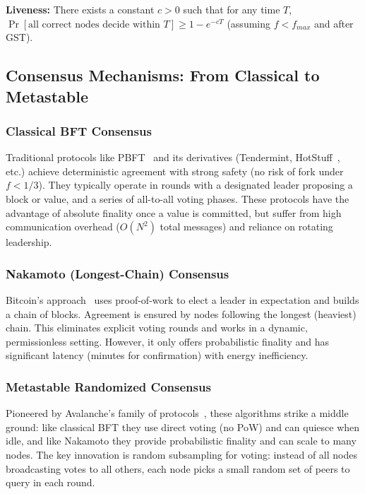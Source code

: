 \textbf{Liveness:} There exists a constant $c>0$ such that for any time $T$, $\Pr[\text{all correct nodes decide within } T] \ge 1 - e^{-c T}$ (assuming $f < f_{max}$ and after GST).

\subsection{Consensus Mechanisms: From Classical to Metastable}

\subsubsection{Classical BFT Consensus}

Traditional protocols like PBFT~\cite{pbft} and its derivatives (Tendermint, HotStuff~\cite{hotstuff}, etc.) achieve deterministic agreement with strong safety (no risk of fork under $f < 1/3$). They typically operate in rounds with a designated leader proposing a block or value, and a series of all-to-all voting phases. These protocols have the advantage of absolute finality once a value is committed, but suffer from high communication overhead ($O(N^2)$ total messages) and reliance on rotating leadership.

\subsubsection{Nakamoto (Longest-Chain) Consensus}

Bitcoin's approach~\cite{bitcoin} uses proof-of-work to elect a leader in expectation and builds a chain of blocks. Agreement is ensured by nodes following the longest (heaviest) chain. This eliminates explicit voting rounds and works in a dynamic, permissionless setting. However, it only offers probabilistic finality and has significant latency (minutes for confirmation) with energy inefficiency.

\subsubsection{Metastable Randomized Consensus}

Pioneered by Avalanche's family of protocols~\cite{avalanche}, these algorithms strike a middle ground: like classical BFT they use direct voting (no PoW) and can quiesce when idle, and like Nakamoto they provide probabilistic finality and can scale to many nodes. The key innovation is random subsampling for voting: instead of all nodes broadcasting votes to all others, each node picks a small random set of peers to query in each round.

